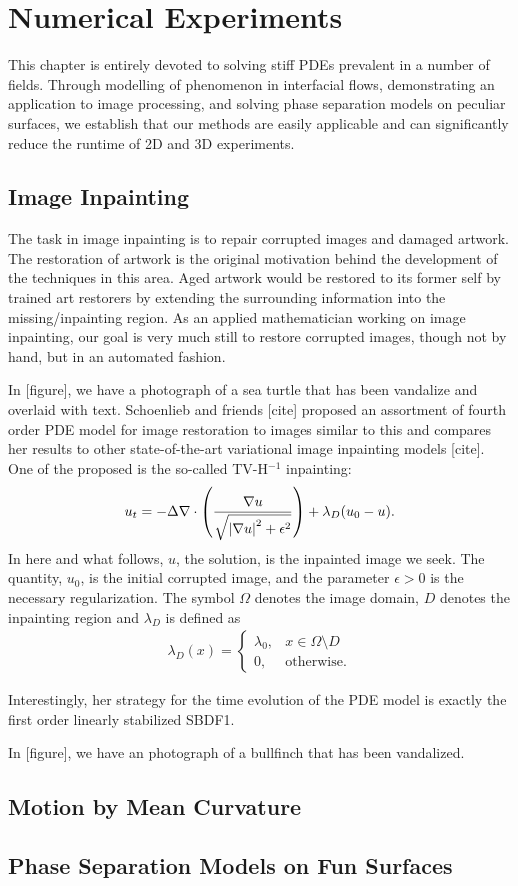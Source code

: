 \chapter{Numerical Experiments}
\label{chap:num experiments}
This chapter is entirely devoted to solving stiff PDEs prevalent in a number of fields. Through modelling of phenomenon in interfacial flows, demonstrating an application to image processing, and solving phase separation models on peculiar surfaces, we establish that our methods are easily applicable and can significantly reduce the runtime of 2D and 3D experiments.

\section{Image Inpainting}
The task in image inpainting is to repair corrupted images and damaged artwork. The restoration of artwork is the original motivation behind the development of the techniques in this area. Aged artwork would be restored to its former self by trained art restorers by extending the surrounding information into the missing/inpainting region. As an applied mathematician working on image inpainting, our goal is very much still to restore corrupted images, though not by hand, but in an automated fashion.

In [figure], we have a photograph of a sea turtle that has been vandalize and overlaid with text. Schoenlieb and friends [cite] proposed an assortment of fourth order PDE model for image restoration to images similar to this and compares her results to other state-of-the-art variational image inpainting models [cite]. One of the proposed is the so-called TV-H$^{-1}$ inpainting: 
\begin{align}
u_t = -\Delta \nabla \cdot \left(\frac{\nabla u}{\sqrt{\left|\nabla u\right|^2 + \epsilon^2}}\right)
+ \lambda_D(u_0 - u).
\end{align}
In here and what follows, $u$, the solution, is the inpainted image we seek. The quantity, $u_0$, is the initial corrupted image, and the parameter $\epsilon > 0$ is the necessary regularization. The symbol $\Omega$ denotes the image domain, $D$ denotes the inpainting region and $\lambda_D$ is defined as 
\begin{align}
\lambda_D(x)
= \begin{cases}
\lambda_0, & x\in \Omega\setminus D
\\
0, &\text{otherwise}.
\end{cases}
\end{align}


Interestingly, her strategy for the time evolution of the PDE model is exactly the first order linearly stabilized SBDF1. 




In [figure], we have an photograph of a bullfinch that has been vandalized.


\section{Motion by Mean Curvature}



\section{Phase Separation Models on Fun Surfaces}